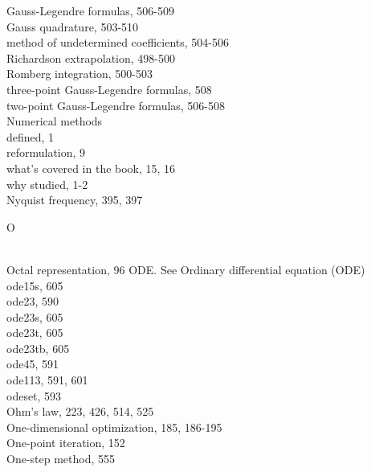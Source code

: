 \documentclass[../main.tex]{subfiles}
\begin{document}
\begin{multicols}{3}
    \hspace*{3mm}Gauss-Legendre formulas, 506-509\\
    \hspace*{3mm}Gauss quadrature, 503-510\\
    \hspace*{3mm}method of undetermined coefficients, 504-506\\
    \hspace*{3mm}Richardson extrapolation, 498-500\\
    \hspace*{3mm}Romberg integration, 500-503\\
    \hspace*{3mm}three-point Gauss-Legendre formulas, 508\\
    \hspace*{3mm}two-point Gauss-Legendre formulas, 506-508\\
    Numerical methods\\
    \hspace*{3mm}defined, 1\\
    \hspace*{3mm}reformulation, 9\\
    \hspace*{3mm}what's covered in the book, 15, 16\\
    \hspace*{3mm}why studied, 1-2\\
    Nyquist frequency, 395, 397\vspace*{2mm}\\
    \begin{huge} O \end{huge}\\
    Octal representation, 96
    ODE. See Ordinary differential equation (ODE)\\
    ode15s, 605\\
    ode23, 590\\
    ode23s, 605\\
    ode23t, 605\\
    ode23tb, 605\\
    ode45, 591\\
    ode113, 591, 601\\
    odeset, 593\\
    Ohm's law, 223, 426, 514, 525\\
    One-dimensional optimization, 185, 186-195\\
    One-point iteration, 152\\
    One-step method, 555\\

\end{multicols}
\end{document}
